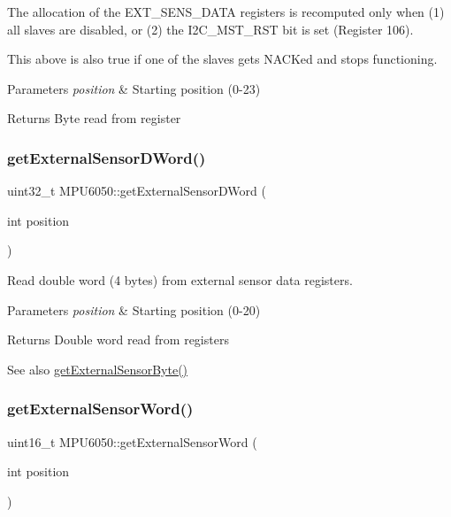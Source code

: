 The allocation of the E\+X\+T\+\_\+\+S\+E\+N\+S\+\_\+\+D\+A\+TA registers is recomputed only when (1) all slaves are disabled, or (2) the I2\+C\+\_\+\+M\+S\+T\+\_\+\+R\+ST bit is set (Register 106).

This above is also true if one of the slaves gets N\+A\+C\+Ked and stops functioning.


\begin{DoxyParams}{Parameters}
{\em position} & Starting position (0-\/23) \\
\hline
\end{DoxyParams}
\begin{DoxyReturn}{Returns}
Byte read from register 
\end{DoxyReturn}
\mbox{\label{class_m_p_u6050_afd8983f0911e37015434bebc85185fb2}} 
\subsubsection{\texorpdfstring{getExternalSensorDWord()}{getExternalSensorDWord()}}
{\footnotesize\ttfamily uint32\+\_\+t M\+P\+U6050\+::get\+External\+Sensor\+D\+Word (\begin{DoxyParamCaption}\item[{int}]{position }\end{DoxyParamCaption})}

Read double word (4 bytes) from external sensor data registers. 
\begin{DoxyParams}{Parameters}
{\em position} & Starting position (0-\/20) \\
\hline
\end{DoxyParams}
\begin{DoxyReturn}{Returns}
Double word read from registers 
\end{DoxyReturn}
\begin{DoxySeeAlso}{See also}
\mbox{\hyperlink{class_m_p_u6050_a7f786ab4264f40e5a95e8937ec9adcc2}{get\+External\+Sensor\+Byte()}} 
\end{DoxySeeAlso}
\mbox{\label{class_m_p_u6050_aaee15e48af7ba78660b5754f3bb5f37a}} 
\subsubsection{\texorpdfstring{getExternalSensorWord()}{getExternalSensorWord()}}
{\footnotesize\ttfamily uint16\+\_\+t M\+P\+U6050\+::get\+External\+Sensor\+Word (\begin{DoxyParamCaption}\item[{int}]{position }\end{DoxyParamCaption})}

